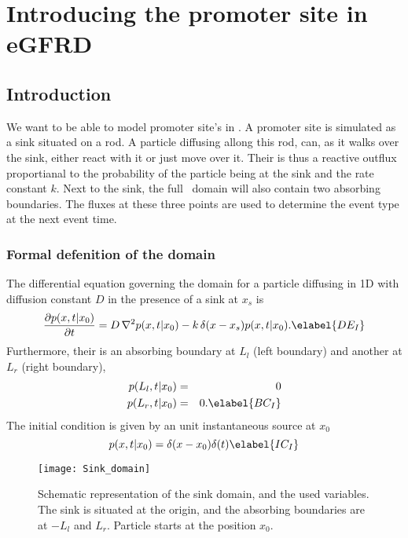 \section{Introducing the promoter site in eGFRD}


\subsection{Introduction}

We want to be able to model promoter site's in \GFRD. A promoter site is simulated as a sink situated on a rod. A particle diffusing allong this rod, can, as it walks over the sink, either react with it or just move over it. Their is thus a reactive outflux proportianal to the probability of the particle being at the sink and the rate constant $k$. Next to the sink, the full \GFRD\, domain will also contain two absorbing boundaries. The fluxes at these three points are used to determine the event type at the next event time.

\subsubsection{Formal defenition of the domain}

The differential equation governing the domain for a particle diffusing in 1D with diffusion constant $D$ in the presence of a sink at $x_s$ is
\begin{equation}
 \frac{\partial p(x,t|x_0)}{\partial t} = D \, \nabla ^2 p(x,t|x_0) - k \, \delta (x - x_s) p(x,t|x_0).
 \elabel{DE_I}
\end{equation}
Furthermore, their is an absorbing boundary at $L_l$ (left boundary) and another at $L_r$ (right boundary),
\begin{eqnarray}
 p(L_l,t|x_0) & = & 0 \\
 p(L_r,t|x_0) & = & 0.
\elabel{BC_I}
\end{eqnarray}
The initial condition is given by an unit instantaneous source at $x_0$
\begin{equation}
 p(x,t|x_0) = \delta(x-x_0)\delta(t)
\elabel{IC_I}
\end{equation}

\begin{figure}[bh]
\centering
\texttt{[image: Sink\_domain]}
\caption{ Schematic representation of the sink domain, and the used variables. The sink is situated at the origin, and the absorbing boundaries are at $-L_l$ and $L_r$. Particle starts at the position $x_0$.}
\end{figure}




